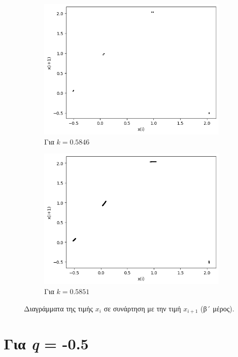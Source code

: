 \begin{figure}[ht]
\begin{subfigure}[b]{0.4\textwidth}
		\includegraphics[width=\textwidth]{LateX images/graphs q03/g13}
		\caption{Για $k=0.5846$}
		\label{f:k25}
	\end{subfigure}
	\hfill
	\begin{subfigure}[b]{0.4\textwidth}
		\centering
		\includegraphics[width=\textwidth]{LateX images/graphs q03/g14}
		\caption{Για $k=0.5851$}
		\label{f:k26}
	\end{subfigure}
	\caption{Διαγράμματα της τιμής \(x_i\) σε συνάρτηση με την τιμή \(x_{i+1}\) (β´ μέρος).}	
\end{figure}

\clearpage

\section{Για \emph{q} = -0.5}

